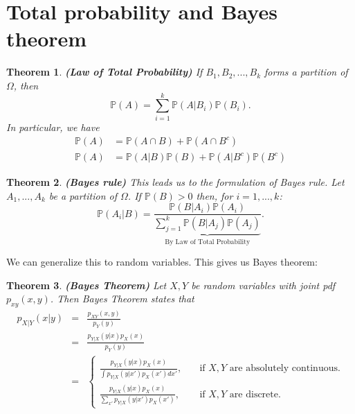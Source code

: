 \documentclass[twoside]{article}
\newcounter{lecnum}
\newtheorem{theorem}{Theorem}[lecnum]
\begin{document}
\section{Total probability and Bayes theorem}
\begin{theorem}
    {\bf (Law of Total Probability)} 
If $B_1,B_2,...,B_k$ forms a partition of $\Omega$, then
$$\mathbb{P}(A) = \sum_{i=1}^k \mathbb{P}(A|B_i) \mathbb{P}(B_i).$$
In particular, we have
\begin{align*}
\mathbb{P}(A) &=\mathbb{P}(A\cap B)+\mathbb{P}(A\cap B^c)\\
\mathbb{P}(A) &= \mathbb{P}(A|B) \mathbb{P}(B) +  \mathbb{P}(A|B^c)\mathbb{P}(B^c)    
\end{align*}
\end{theorem} 
\begin{theorem}
    {\bf (Bayes rule)} This leads us to the formulation of Bayes rule.
Let $A_1,...,A_k$ be a partition of $\Omega$. If $\mathbb{P}(B)>0$ then, for $i=1,...,k$:
$$\mathbb{P}(A_i|B) =\frac{\mathbb{P}(B|A_i)\mathbb{P}(A_i)}{\underbrace{\sum_{j=1}^k \mathbb{P}(B|A_j)\mathbb{P}(A_j)}_{\mbox{By Law of Total Probability}}}.$$
\end{theorem}

We can generalize this to random variables. This gives us Bayes theorem:

\begin{theorem} {\bf (Bayes Theorem)}
    Let $X,Y$ be random variables with joint pdf $p_{xy}(x,y)$. Then Bayes Theorem states that
    \begin{eqnarray*}
p_{X|Y} (x|y) &=& \frac{p_{XY}( x,y)}{p_{Y}(y)}\\
&=& \frac{p_{Y|X}(y|x)p_X(x)}{p_Y(y)}\\
&=&\begin{cases} \frac{p_{Y|X}(y|x)p_X(x)}{\int p_{Y|X}(y|x')p_X(x')dx'}, &\quad\mbox{if $X,Y$ are absolutely continuous.}\\
\frac{p_{Y|X}(y|x)p_X(x)}{\sum_{x'} p_{Y|X}(y|x')p_X(x')}, &\quad\mbox{if $X,Y$ are discrete.}
\end{cases}
\end{eqnarray*}
\end{theorem}
\end{document}
